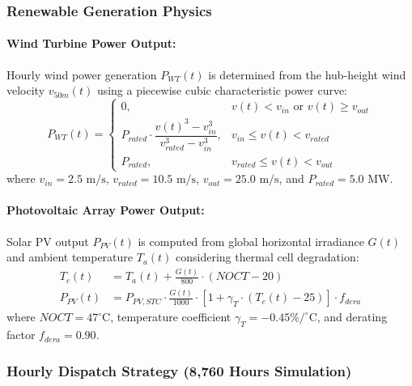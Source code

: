\subsubsection{Renewable Generation Physics}

\paragraph{Wind Turbine Power Output:}
Hourly wind power generation $P_{WT}(t)$ is determined from the hub-height wind velocity $v_{50m}(t)$ using a piecewise cubic characteristic power curve:
\begin{equation}
P_{WT}(t) = \begin{cases}
0, & v(t) < v_{in} \text{ or } v(t) \ge v_{out} \\
P_{rated} \cdot \dfrac{v(t)^3 - v_{in}^3}{v_{rated}^3 - v_{in}^3}, & v_{in} \le v(t) < v_{rated} \\
P_{rated}, & v_{rated} \le v(t) < v_{out}
\end{cases}
\label{eq:wind_power_curve}
\end{equation}
where $v_{in} = 2.5\text{ m/s}$, $v_{rated} = 10.5\text{ m/s}$, $v_{out} = 25.0\text{ m/s}$, and $P_{rated} = 5.0\text{ MW}$.

\paragraph{Photovoltaic Array Power Output:}
Solar PV output $P_{PV}(t)$ is computed from global horizontal irradiance $G(t)$ and ambient temperature $T_a(t)$ considering thermal cell degradation:
\begin{align}
T_c(t) &= T_a(t) + \frac{G(t)}{800} \cdot (NOCT - 20) \label{eq:pv_cell_temp} \\
P_{PV}(t) &= P_{PV,STC} \cdot \frac{G(t)}{1000} \cdot \left[ 1 + \gamma_T \cdot (T_c(t) - 25) \right] \cdot f_{dera} \label{eq:pv_power_output}
\end{align}
where $NOCT = 47^\circ\text{C}$, temperature coefficient $\gamma_T = -0.45\%/^\circ\text{C}$, and derating factor $f_{dera} = 0.90$.

\subsubsection{Hourly Dispatch Strategy (8,760 Hours Simulation)}

